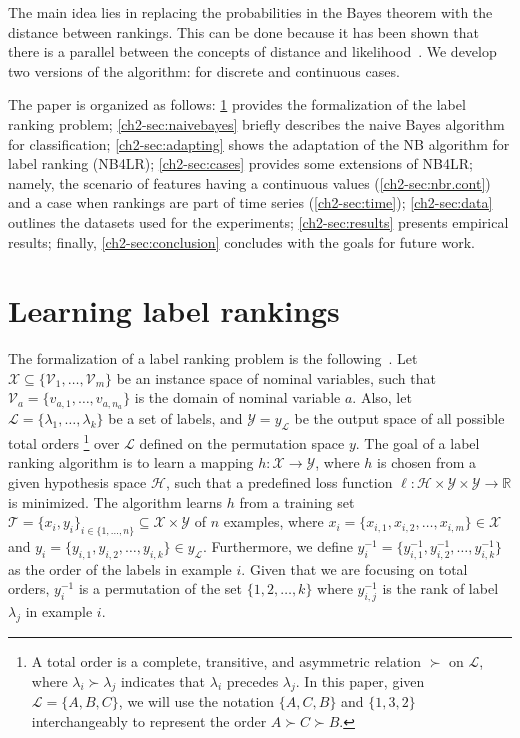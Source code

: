 \documentclass[12pt, a4paper]{article}\usepackage[]{graphicx}\usepackage[]{color}
\begin{document}
The main idea lies in replacing the probabilities in the Bayes theorem with the distance between rankings. This can be done because it has been shown that there is a parallel between the concepts of distance and likelihood~\citep{vogt2007}. We develop two versions of the algorithm: for discrete and continuous cases.

The paper is organized as follows: \ref{ch2-sec:learning} provides the formalization of the label ranking problem; \ref{ch2-sec:naivebayes} briefly  describes the naive Bayes algorithm for classification; \ref{ch2-sec:adapting} shows the adaptation of the NB algorithm for label ranking (NB4LR); \ref{ch2-sec:cases} provides some extensions of NB4LR; namely, the scenario of features having a continuous values (\ref{ch2-sec:nbr.cont})  and a case when rankings are part of time series (\ref{ch2-sec:time}); \ref{ch2-sec:data} outlines the datasets used for the experiments;
\ref{ch2-sec:results} presents empirical results; finally, \ref{ch2-sec:conclusion} concludes with the goals for future work.

 \section{Learning label rankings}
 \label{ch2-sec:learning}

The formalization of a label ranking problem is the following~\citep{vembu2009}. Let $\mathcal{X} \subseteq \{\mathcal{V}_1,\ldots,\mathcal{V}_m\}$ be an instance space of nominal variables, such that $\mathcal{V}_a=\{v_{a,1}, \ldots, v_{a,n_a}\}$ is the domain of nominal variable $a$.  Also, let $\mathcal{L} = \{\lambda_1,\ldots,\lambda_k\}$ be a set of labels, and $\mathcal{Y} = y_{\mathcal{L}}$ be the output space of all possible total orders%
\footnote[1]{A total order is a complete, transitive, and asymmetric relation $\succ$ on $\mathcal{L}$, where $\lambda_i \succ \lambda_j$ indicates that $\lambda_i$ precedes $\lambda_j$. In this paper, given $\mathcal{L}=\{A,B,C\}$, we will use the notation $\{A,C,B\}$ and $\{1,3,2\}$ interchangeably to represent the order $A \succ C \succ B$.} over $\mathcal{L}$ defined on the permutation space $y$. The goal of a label ranking algorithm is to learn a mapping $h: \mathcal{X} \rightarrow \mathcal{Y}$, where $h$ is chosen from a given hypothesis space $\mathcal{H}$, such that a predefined loss function $\ell: \mathcal{H} \times \mathcal{Y} \times \mathcal{Y} \rightarrow \mathbb{R}$ is minimized. The algorithm learns $h$ from a training set $\mathcal{T}=\{x_i,y_i\}_{i \in \{1, \ldots, n\}} \subseteq \mathcal{X} \times \mathcal{Y}$ of $n$ examples, where $x_i = \{x_{i,1}, x_{i,2}, \ldots, x_{i,m} \} \in \mathcal{X}$ and $ y_i = \{y_{i,1}, y_{i,2}, \dots, y_{i,k}\} \in y_{\mathcal{L}}$. Furthermore, we define $y_i^{-1} = \{y_{i,1}^{-1}, y_{i,2}^{-1}, \ldots, y_{i,k}^{-1}\}$ as the order of the labels in example $i$. Given that we are focusing on total orders, $y_i^{-1}$ is a permutation of the set $\{1, 2, \ldots, k\}$ where $y_{i,j}^{-1}$ is the rank of label $\lambda_j$ in example $i$.
\end{document}
